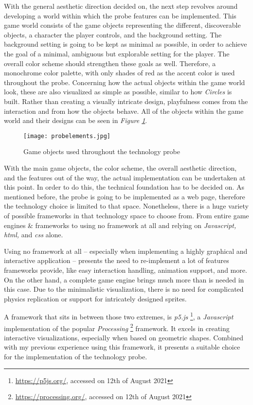With the general aesthetic direction decided on, the next step revolves around developing a world within which the probe features can be implemented. This game world consists of the game objects representing the different, discoverable objects, a character the player controls, and the background setting. The background setting is going to be kept as minimal as possible, in order to achieve the goal of a minimal, ambiguous but explorable setting for the player. The overall color scheme should strengthen these goals as well. Therefore, a monochrome color palette, with only shades of red as the accent color is used throughout the probe. Concerning how the actual objects within the game world look, these are also visualized as simple as possible, similar to how \textit{Circles} \cite{circles2017} is built. Rather than creating a visually intricate design, playfulness comes from the interaction and from how the objects behave. All of the objects within the game world and their designs can be seen in \textit{Figure \ref{fig:probeobjects}}.

\begin{figure}[h]
  \centering
  \texttt{[image: probelements.jpg]}
  \caption{Game objects used throughout the technology probe}
  \label{fig:probeobjects}
\end{figure}

With the main game objects, the color scheme, the overall aesthetic direction, and the features out of the way, the actual implementation can be undertaken at this point. In order to do this, the technical foundation has to be decided on. As mentioned before, the probe is going to be implemented as a web page, therefore the technology choice is limited to that space. Nonetheless, there is a huge variety of possible frameworks in that technology space to choose from. From entire game engines \& frameworks to using no framework at all and relying on \textit{Javascript, \gls{html},} and \textit{\gls{css}} alone.

Using no framework at all -- especially when implementing a highly graphical and interactive application -- presents the need to re-implement a lot of features frameworks provide, like easy interaction handling, animation support, and more. On the other hand, a complete game engine brings much more than is needed in this case. Due to the minimalistic visualization, there is no need for complicated physics replication or support for intricately designed sprites.

A framework that sits in between those two extremes, is \textit{p5.js} \footnote{\url{https://p5js.org/}, accessed on 12th of August 2021}, a \textit{Javascript} implementation of the popular \textit{Processing} \footnote{\url{https://processing.org/}, accessed on 12th of August 2021} framework. It excels in creating interactive visualizations, especially when based on geometric shapes. Combined with my previous experience using this framework, it presents a suitable choice for the implementation of the technology probe.

